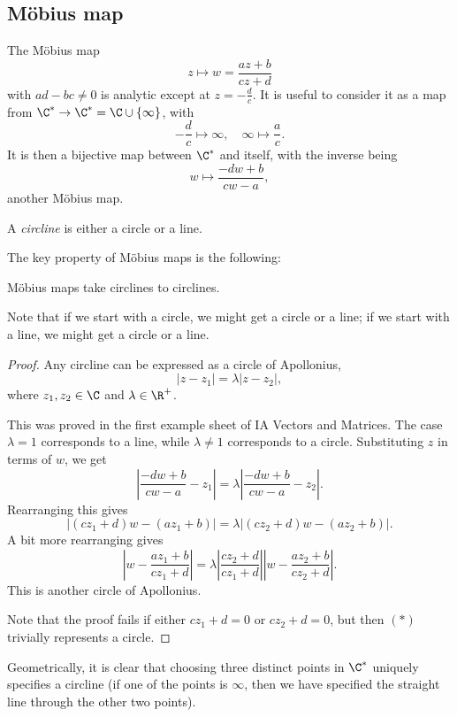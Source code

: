 \documentclass[a4paper]{article}
\begin{document}
\subsection{M\"obius map}
The M\"obius map
\[
  z \mapsto w = \frac{az + b}{cz + d}
\]
with $ad - bc \not= 0$ is analytic except at $z = -\frac{d}{c}$. It is useful to consider it as a map from $\C^* \to \C^* = \C \cup \{\infty\}$, with
\[
  -\frac{d}{c} \mapsto \infty,\quad \infty \mapsto \frac{a}{c}.
\]
It is then a bijective map between $\C^*$ and itself, with the inverse being
\[
  w \mapsto \frac{-d w + b}{cw - a},
\]
another M\"obius map.

\begin{defi}[Circline]
  A \emph{circline} is either a circle or a line.
\end{defi}

The key property of M\"obius maps is the following:
\begin{prop}
  M\"obius maps take circlines to circlines.
\end{prop}
Note that if we start with a circle, we might get a circle or a line; if we start with a line, we might get a circle or a line.

\begin{proof}
  Any circline can be expressed as a circle of Apollonius,
  \[
    |z - z_1| = \lambda |z - z_2|,
  \]
  where $z_1, z_2 \in \C$ and $\lambda \in \R^+$.

  This was proved in the first example sheet of IA Vectors and Matrices. The case $\lambda = 1$ corresponds to a line, while $\lambda \not= 1$ corresponds to a circle. Substituting $z$ in terms of $w$, we get
  \[
    \left|\frac{-dw + b}{cw - a} - z_1\right| = \lambda \left|\frac{-dw + b}{cw - a} - z_2 \right|.
  \]
  Rearranging this gives
  \[
    |(cz_1 + d) w - (az_1 + b)| = \lambda|(cz_2 + d)w - (az_2 + b)|.\tag{$*$}
  \]
  A bit more rearranging gives
  \[
    \left|w - \frac{az_1 + b}{cz_1 + d}\right| = \lambda \left|\frac{cz_2 + d}{cz_1 + d}\right|\left|w - \frac{az_2 + b}{cz_2 + d}\right|.
  \]
  This is another circle of Apollonius.

  Note that the proof fails if either $cz_1 + d = 0$ or $cz_2 + d = 0$, but then $(*)$ trivially represents a circle.
\end{proof}

Geometrically, it is clear that choosing three distinct points in $\C^*$ uniquely specifies a circline (if one of the points is $\infty$, then we have specified the straight line through the other two points).
\end{document}
